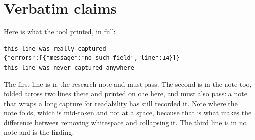 \section{Verbatim claims}
\label{sec:ch01-verbatim}

Here is what the tool printed, in full:

\begin{verbatim}
this line was really captured
{"errors":[{"message":"no such field","line":14}]}
this line was never captured anywhere
\end{verbatim}

The first line is in the research note and must pass. The second is in the note
too, folded across two lines there and printed on one here, and must also pass:
a note that wraps a long capture for readability has still recorded it. Note
where the note folds, which is mid-token and not at a space, because that is
what makes the difference between removing whitespace and collapsing it. The
third line is in no note and is the finding.
